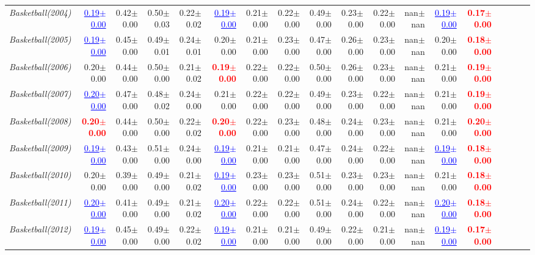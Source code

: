 \documentclass[nohyperref]{article}
\theoremstyle{plain}
\theoremstyle{definition}
\theoremstyle{remark}
\newcommand{\red}[1]{\textcolor{red}{\textbf{#1}}}
\newcommand{\blue}[1]{\textcolor{blue}{\underline{#1}}}
\begin{document}
\begin{table*}[!ht]
{\begin{tabular}{lrrrrrrrrrrrrrrrrr}
			{\it Basketball(2004)} & \blue{0.19$\pm$0.00} & 0.42$\pm$0.00 & 0.50$\pm$0.03 & 0.22$\pm$0.02 & \blue{0.19$\pm$0.00} & 0.21$\pm$0.00 & 0.22$\pm$0.00 & 0.49$\pm$0.00 & 0.23$\pm$0.00 & 0.22$\pm$0.00 & nan$\pm$nan & \blue{0.19$\pm$0.00} & \red{0.17$\pm$0.00} \\
			{\it Basketball(2005)} & \blue{0.19$\pm$0.00} & 0.45$\pm$0.00 & 0.49$\pm$0.01 & 0.24$\pm$0.01 & 0.20$\pm$0.00 & 0.21$\pm$0.00 & 0.23$\pm$0.00 & 0.47$\pm$0.00 & 0.26$\pm$0.00 & 0.23$\pm$0.00 & nan$\pm$nan & 0.20$\pm$0.00 & \red{0.18$\pm$0.00} \\
			{\it Basketball(2006)} & 0.20$\pm$0.00 & 0.44$\pm$0.00 & 0.50$\pm$0.00 & 0.21$\pm$0.02 & \red{0.19$\pm$0.00} & 0.22$\pm$0.00 & 0.22$\pm$0.00 & 0.50$\pm$0.00 & 0.26$\pm$0.00 & 0.23$\pm$0.00 & nan$\pm$nan & 0.21$\pm$0.00 & \red{0.19$\pm$0.00} \\
			{\it Basketball(2007)} & \blue{0.20$\pm$0.00} & 0.47$\pm$0.00 & 0.48$\pm$0.02 & 0.24$\pm$0.00 & 0.21$\pm$0.00 & 0.22$\pm$0.00 & 0.22$\pm$0.00 & 0.49$\pm$0.00 & 0.23$\pm$0.00 & 0.22$\pm$0.00 & nan$\pm$nan & 0.21$\pm$0.00 & \red{0.19$\pm$0.00} \\
			{\it Basketball(2008)} & \red{0.20$\pm$0.00} & 0.44$\pm$0.00 & 0.50$\pm$0.00 & 0.22$\pm$0.02 & \red{0.20$\pm$0.00} & 0.22$\pm$0.00 & 0.23$\pm$0.00 & 0.48$\pm$0.00 & 0.24$\pm$0.00 & 0.23$\pm$0.00 & nan$\pm$nan & 0.21$\pm$0.00 & \red{0.20$\pm$0.00} \\
			{\it Basketball(2009)} & \blue{0.19$\pm$0.00} & 0.43$\pm$0.00 & 0.51$\pm$0.00 & 0.24$\pm$0.00 & \blue{0.19$\pm$0.00} & 0.21$\pm$0.00 & 0.21$\pm$0.00 & 0.47$\pm$0.00 & 0.24$\pm$0.00 & 0.22$\pm$0.00 & nan$\pm$nan & \blue{0.19$\pm$0.00} & \red{0.18$\pm$0.00} \\
			{\it Basketball(2010)} & 0.20$\pm$0.00 & 0.39$\pm$0.00 & 0.49$\pm$0.00 & 0.21$\pm$0.02 & \blue{0.19$\pm$0.00} & 0.23$\pm$0.00 & 0.23$\pm$0.00 & 0.51$\pm$0.00 & 0.23$\pm$0.00 & 0.23$\pm$0.00 & nan$\pm$nan & 0.21$\pm$0.00 & \red{0.18$\pm$0.00} \\
			{\it Basketball(2011)} & \blue{0.20$\pm$0.00} & 0.41$\pm$0.00 & 0.49$\pm$0.00 & 0.21$\pm$0.02 & \blue{0.20$\pm$0.00} & 0.22$\pm$0.00 & 0.22$\pm$0.00 & 0.51$\pm$0.00 & 0.24$\pm$0.00 & 0.22$\pm$0.00 & nan$\pm$nan & \blue{0.20$\pm$0.00} & \red{0.18$\pm$0.00} \\
			{\it Basketball(2012)} & \blue{0.19$\pm$0.00} & 0.45$\pm$0.00 & 0.49$\pm$0.00 & 0.22$\pm$0.02 & \blue{0.19$\pm$0.00} & 0.21$\pm$0.00 & 0.21$\pm$0.00 & 0.49$\pm$0.00 & 0.22$\pm$0.00 & 0.21$\pm$0.00 & nan$\pm$nan & \blue{0.19$\pm$0.00} & \red{0.17$\pm$0.00} \\

\end{tabular}}
\end{table*}
\end{document}
